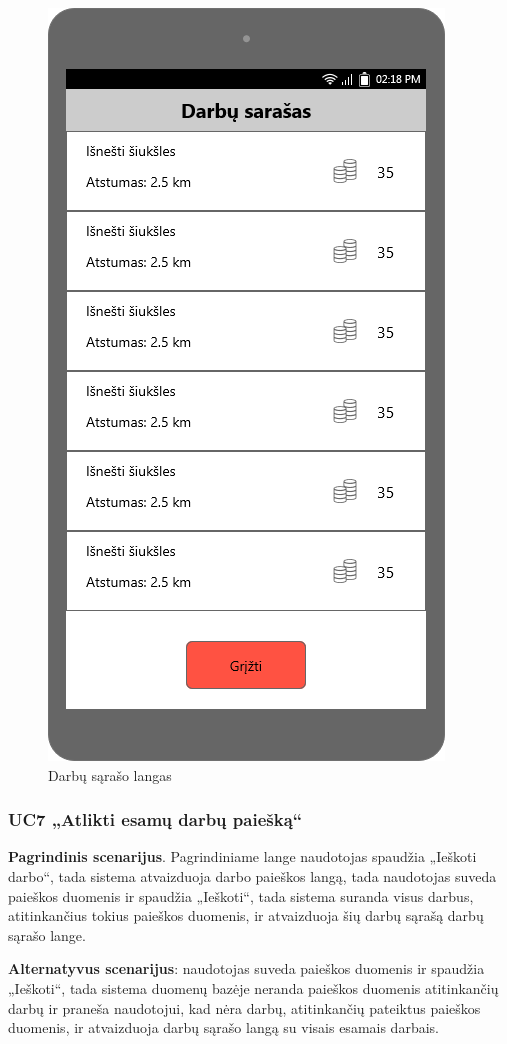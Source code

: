 \documentclass{VUMIFPSbakalaurinis}
\begin{document}
\begin{figure}[H]
	\centering
	\includegraphics[scale=0.4]{img/ScreenShots/09-Darbų-sąrašas}
	\caption{Darbų sąrašo langas}
	\label{img:work list}
\end{figure}
\subsubsection{UC7 „Atlikti esamų darbų paiešką“}
\textbf{Pagrindinis scenarijus}. Pagrindiniame lange naudotojas spaudžia „Ieškoti darbo“, tada sistema atvaizduoja darbo paieškos langą, tada naudotojas suveda paieškos duomenis ir spaudžia „Ieškoti“, tada sistema suranda visus darbus, atitinkančius tokius paieškos duomenis, ir atvaizduoja šių darbų sąrašą darbų sąrašo lange. 
\par \textbf{Alternatyvus scenarijus}: naudotojas suveda paieškos duomenis ir spaudžia „Ieškoti“, tada sistema duomenų bazėje neranda paieškos duomenis atitinkančių darbų ir praneša naudotojui, kad nėra darbų, atitinkančių pateiktus paieškos duomenis, ir atvaizduoja darbų sąrašo langą su visais esamais darbais.
\end{document}
